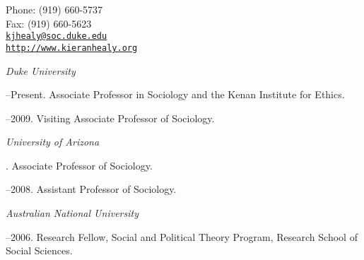 \documentclass[11pt]{article}
\makeatletter
\def\myemail{kjhealy@soc.duke.edu}
\def\myweb{http://www.kieranhealy.org}
\def\myphone{(919) 660-5737}
\def\myfax{(919) 660-5623}
\makeatother
\begin{document}
\begin{minipage}[t]{2.95in}
  
\end{minipage}
\hfill     
\hfill
\begin{minipage}[t]{1.7in}
  \flushright \footnotesize Phone: \myphone \\ 
  Fax: \myfax  \\ 
  {\scriptsize  \texttt{\href{mailto:\myemail}{\myemail}}} \\
  {\scriptsize  \texttt{\href{\myweb}{\myweb}}}
\end{minipage}


\medskip

\reversemarginpar

\medskip       

\medskip
{}

\noindent\emph{Duke University \vspace{0.01in}}

--Present. Associate Professor in Sociology and the Kenan Institute for Ethics.      

--2009. Visiting Associate Professor of Sociology.

\medskip
\noindent\emph{University of Arizona \vspace{0.01in}}

. Associate Professor of Sociology.

--2008. Assistant Professor of Sociology.

\medskip

\noindent\emph{Australian National University \vspace{0.01in}}

--2006. Research Fellow, Social and Political Theory Program,
Research School of Social Sciences.
\end{document}
